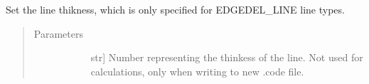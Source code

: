 \documentclass[letterpaper,10pt,english,openany,oneside]{sphinxmanual}
\begin{document}
\begin{fulllineitems}
\begin{fulllineitems}
\end{fulllineitems}


\begin{fulllineitems}
\label{\detokenize{reference:cnc.optimization.Line.set_thikness}}
Set the line thikness, which is only specified for EDGEDEL\_LINE line
types.
\begin{quote}\begin{description}
\item[{Parameters}] \leavevmode\begin{description}
\item[{}] \leavevmode{[}str{]}
Number representing the thinkess of the line. Not used for
calculations, only when writing to new .code file.

\end{description}

\end{description}\end{quote}

\end{fulllineitems}


\end{fulllineitems}

\label{\detokenize{reference:module-cnc.visualization}}
\end{document}
